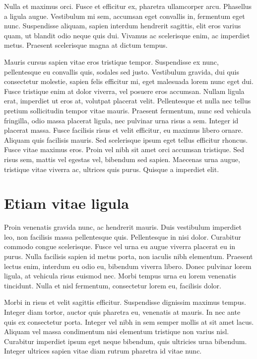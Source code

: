 Nulla et maximus orci. Fusce et efficitur ex, pharetra ullamcorper arcu. Phasellus a ligula augue. Vestibulum mi sem, accumsan eget convallis in, fermentum eget nunc. Suspendisse aliquam, sapien interdum hendrerit sagittis, elit eros varius quam, ut blandit odio neque quis dui. Vivamus ac scelerisque enim, ac imperdiet metus. Praesent scelerisque magna at dictum tempus.

Mauris cursus sapien vitae eros tristique tempor. Suspendisse ex nunc, pellentesque eu convallis quis, sodales sed justo. Vestibulum gravida, dui quis consectetur molestie, sapien felis efficitur mi, eget malesuada lorem nunc eget dui. Fusce tristique enim at dolor viverra, vel posuere eros accumsan. Nullam ligula erat, imperdiet ut eros at, volutpat placerat velit. Pellentesque et nulla nec tellus pretium sollicitudin tempor vitae mauris. Praesent fermentum, nunc sed vehicula fringilla, odio massa placerat ligula, nec pulvinar urna risus a sem. Integer id placerat massa. Fusce facilisis risus et velit efficitur, eu maximus libero ornare. Aliquam quis facilisis mauris. Sed scelerisque ipsum eget tellus efficitur rhoncus. Fusce vitae maximus eros. Proin vel nibh sit amet orci accumsan tristique. Sed risus sem, mattis vel egestas vel, bibendum sed sapien. Maecenas urna augue, tristique vitae viverra ac, ultrices quis purus. Quisque a imperdiet elit.

\section{Etiam vitae ligula}
Proin venenatis gravida nunc, ac hendrerit mauris. Duis vestibulum imperdiet leo, non facilisis massa pellentesque quis. Pellentesque in nisi dolor. Curabitur commodo congue scelerisque. Fusce vel urna eu augue viverra placerat eu in purus. Nulla facilisis sapien id metus porta, non iaculis nibh elementum. Praesent lectus enim, interdum eu odio eu, bibendum viverra libero. Donec pulvinar lorem ligula, at vehicula risus euismod nec. Morbi tempus urna eu lorem venenatis tincidunt. Nulla et nisl fermentum, consectetur lorem eu, facilisis dolor.

Morbi in risus et velit sagittis efficitur. Suspendisse dignissim maximus tempus. Integer diam tortor, auctor quis pharetra eu, venenatis at mauris. In nec ante quis ex consectetur porta. Integer vel nibh in sem semper mollis at sit amet lacus. Aliquam vel massa condimentum nisi elementum tristique non varius nisl. Curabitur imperdiet ipsum eget neque bibendum, quis ultricies urna bibendum. Integer ultrices sapien vitae diam rutrum pharetra id vitae nunc.


